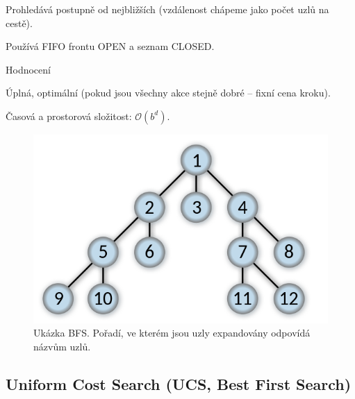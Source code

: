 \begin{compactitem}
    \item Prohledává postupně od nejbližších (vzdálenost chápeme jako počet uzlů na cestě).
    \item Používá FIFO frontu OPEN a seznam CLOSED.

    \item Hodnocení \begin{compactitem}
        \item Úplná, optimální (pokud jsou všechny akce stejně dobré -- fixní cena kroku).
        \item Časová a prostorová složitost: $\mathcal{O}(b^d)$.
    \end{compactitem}

    \begin{figure}[H]
        \centering
        \includegraphics[width=0.5\linewidth]{bfs.png}
        \caption{Ukázka BFS. Pořadí, ve kterém jsou uzly expandovány odpovídá názvům uzlů.}
    \end{figure}
\end{compactitem}

\subsection{Uniform Cost Search (UCS, Best First Search)}

